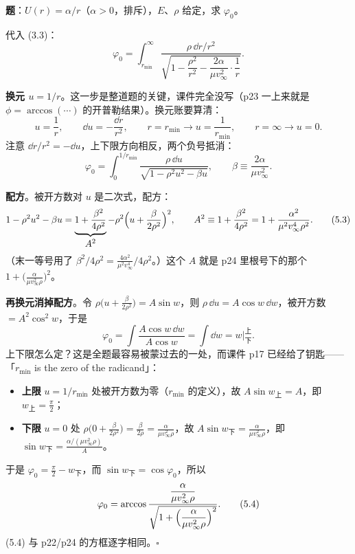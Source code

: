 \documentclass[11pt]{ctexart}
\begin{document}

\textbf{题}：$U(r)=\alpha/r$（$\alpha>0$，排斥），$E$、$\rho$ 给定，求 $\varphi_0$。

代入 (3.3)：
\[
\varphi_0=\int_{r_{\min}}^{\infty}\frac{\rho\,\dd r/r^{2}}{\sqrt{1-\dfrac{\rho^{2}}{r^{2}}-\dfrac{2\alpha}{\mu v_\infty^{2}}\cdot\dfrac{1}{r}}} . \tag{5.1}
\]

\textbf{换元 $u=1/r$}。这一步是整道题的关键，课件完全没写（p23 一上来就是 $\phi=\arccos(\cdots)$ 的开普勒结果）。换元账要算清：
\[
u=\frac1r,\qquad \dd u=-\frac{\dd r}{r^{2}},\qquad r=r_{\min}\to u=\frac{1}{r_{\min}},\qquad r=\infty\to u=0 .
\]
注意 $\dd r/r^2=-\dd u$，上下限方向相反，两个负号抵消：
\[
\varphi_0=\int_{0}^{1/r_{\min}}\frac{\rho\,\dd u}{\sqrt{1-\rho^{2}u^{2}-\beta u}},
\qquad \beta\equiv\frac{2\alpha}{\mu v_\infty^{2}} . \tag{5.2}
\]

\textbf{配方}。被开方数对 $u$ 是二次式，配方：
\[
1-\rho^{2}u^{2}-\beta u
=\underbrace{1+\frac{\beta^{2}}{4\rho^{2}}}_{\textstyle A^{2}}-\rho^{2}\Bigl(u+\frac{\beta}{2\rho^{2}}\Bigr)^{2},
\qquad A^{2}\equiv1+\frac{\beta^{2}}{4\rho^{2}}=1+\frac{\alpha^{2}}{\mu^{2}v_\infty^{4}\rho^{2}} . \tag{5.3}
\]
（末一等号用了 $\beta^2/4\rho^2=\frac{4\alpha^2}{\mu^2v_\infty^4}\big/4\rho^2$。）这个 $A$ 就是 p24 里根号下的那个 $1+\bigl(\frac{\alpha}{\mu v_\infty^2\rho}\bigr)^2$。

\textbf{再换元消掉配方}。令 $\rho\bigl(u+\frac{\beta}{2\rho^{2}}\bigr)=A\sin w$，则 $\rho\,\dd u=A\cos w\,\dd w$，被开方数 $=A^2\cos^2w$，于是
\[
\varphi_0=\int\frac{A\cos w\,\dd w}{A\cos w}=\int\dd w=w\Big|_{\text{下}}^{\text{上}} .
\]
上下限怎么定？这是全题最容易被蒙过去的一处，而课件 p17 已经给了钥匙——「$r_{\min}$ is the zero of the radicand」：

\begin{itemize}
\item \textbf{上限} $u=1/r_{\min}$ 处被开方数为零（$r_{\min}$ 的定义），故 $A\sin w_{\text{上}}=A$，即 $w_{\text{上}}=\frac\pi2$；
\item \textbf{下限} $u=0$ 处 $\rho\bigl(0+\frac{\beta}{2\rho^{2}}\bigr)=\frac{\beta}{2\rho}=\frac{\alpha}{\mu v_\infty^2\rho}$，故
$A\sin w_{\text{下}}=\frac{\alpha}{\mu v_\infty^2\rho}$，即 $\sin w_{\text{下}}=\frac{\alpha/(\mu v_\infty^2\rho)}{A}$。
\end{itemize}
于是 $\varphi_0=\frac\pi2-w_{\text{下}}$，而 $\sin w_{\text{下}}=\cos\varphi_0$，所以
\[
\varphi_0=\arccos\frac{\dfrac{\alpha}{\mu v_\infty^{2}\rho}}{\sqrt{1+\Bigl(\dfrac{\alpha}{\mu v_\infty^{2}\rho}\Bigr)^{2}}} . \tag{5.4}
\]
(5.4) 与 p22/p24 的方框逐字相同。\hfill$\square$
\end{document}
